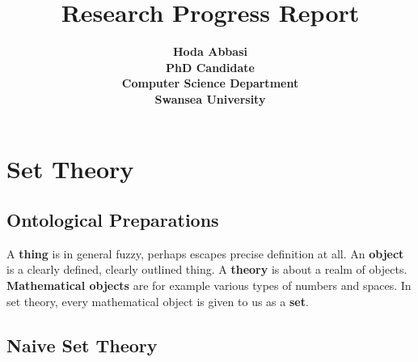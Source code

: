 \documentclass[12pt]{book}
\begin{document}
\title{\bf \Huge Research Progress Report}

\author{ \bf Hoda Abbasi\\
             PhD Candidate\\
             Computer Science Department\\
             Swansea University\\}
\maketitle
\tableofcontents
\chapter{Set Theory}
\label{cha:settheory}
\section{Ontological Preparations}
\label{sec:Ontological preparations}

A \textbf{thing} is in general fuzzy, perhaps escapes precise definition at all. An \textbf{object} is a clearly defined, clearly outlined 
thing. A \textbf{theory} is about a realm of objects. \textbf{Mathematical objects} are for example various types of numbers and spaces. 
In set theory, every mathematical object is given to us as a \textbf{set}.
\section{Naive Set Theory}
\label{sec:Naivesettheory}
\end{document}
